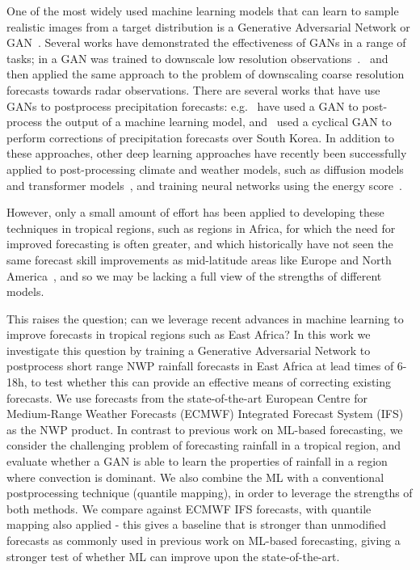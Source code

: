 \documentclass{article}
\begin{document}
One of the most widely used machine learning models that can learn to sample realistic images from a target distribution is a Generative Adversarial Network or GAN~\citep{goodfellow_generative_2014}. Several works have demonstrated the effectiveness of GANs in a range of tasks; in \cite{leinonen_stochastic_2020} a GAN was trained to downscale low resolution observations~\citep{leinonen_stochastic_2020}.~\cite{harris_generative_2022} and~\cite{price_increasing_2022} then applied the same approach to the problem of downscaling coarse resolution forecasts towards radar observations. There are several works that have use GANs to postprocess precipitation forecasts: e.g.~\cite{duncan_generative_2022} have used a GAN to post-process the output of a machine learning model, and~\cite{jeong_correcting_2023} used a cyclical GAN to perform corrections of precipitation forecasts over South Korea. In addition to these approaches, other deep learning approaches have recently been successfully applied to post-processing climate and weather models, such as diffusion models~\citep{li_seeds_2023, addison_machine_2022, leinonen_latent_2023} and transformer models~\citep{ben-bouallegue_improving_2023}, and training neural networks using the energy score~\cite{pacchiardi_probabilistic_2021}.


However, only a small amount of effort has been applied to developing these techniques in tropical regions, such as regions in Africa, for which the need for improved forecasting is often greater, and which historically have not seen the same forecast skill improvements as mid-latitude areas like Europe and North America~\citep{youds_gcrf_2021}, and so we may be lacking a full view of the strengths of different models.

This raises the question; can we leverage recent advances in machine learning to improve forecasts in tropical regions such as East Africa? In this work we investigate this question by training a Generative Adversarial Network to postprocess short range NWP rainfall forecasts in East Africa at lead times of 6-18h, to test whether this can provide an effective means of correcting existing forecasts. We use forecasts from the state-of-the-art European Centre for Medium-Range Weather Forecasts (ECMWF) Integrated Forecast System (IFS) as the NWP product. In contrast to previous work on ML-based forecasting, we consider the challenging problem of forecasting rainfall in a tropical region, and evaluate whether a GAN is able to learn the properties of rainfall in a region where convection is dominant. We also combine the ML with a conventional postprocessing technique (quantile mapping), in order to leverage the strengths of both methods. We compare against ECMWF IFS forecasts, with quantile mapping also applied - this gives a baseline that is stronger than unmodified forecasts as commonly used in previous work on ML-based forecasting, giving a stronger test of whether ML can improve upon the state-of-the-art. 
\end{document}
